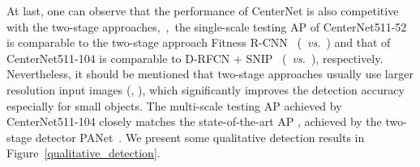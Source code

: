 \documentclass[10pt,twocolumn,letterpaper]{article}
\begin{document}
At last, one can observe that the performance of CenterNet is also competitive with the two-stage approaches,~\eg,~the single-scale testing AP of CenterNet511-52 is comparable to the two-stage approach Fitness R-CNN~\cite{tychsen2018improving} (~\emph{vs.}~) and that of CenterNet511-104 is comparable to D-RFCN + SNIP~\cite{singh2018analysis} (~\emph{vs.}~), respectively. Nevertheless, it should be mentioned that two-stage approaches usually use larger resolution input images (\eg, ), which significantly improves the detection accuracy especially for small objects. 
The multi-scale testing AP  achieved by CenterNet511-104 closely matches the state-of-the-art AP , achieved by the two-stage detector PANet~\cite{liu2018path}. We present some qualitative detection results in Figure~\ref{qualitative_detection}.
\begin{figure*}[t]
  \hspace{-0.1in}
  \hspace{-0.11in}
  \hspace{-0.11in}
  \hspace{-0.11in}
  \vspace{-0.12in}
  \hspace{-0.11in}
  \renewcommand\thesubfigure{(a)}
  \hspace{-0.1in}
  \renewcommand\thesubfigure{(b)}
  \hspace{-0.11in}
  \renewcommand\thesubfigure{(c)}
  \hspace{-0.04in}
  \renewcommand\thesubfigure{(d)}

\end{figure*}
\end{document}
